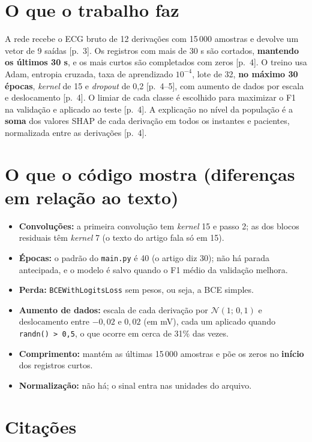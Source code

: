 \documentclass[11pt,a4paper]{article}
\begin{document}
\section{O que o trabalho faz}
A rede recebe o ECG bruto de 12 derivações com 15\,000 amostras e devolve um vetor de 9 saídas [p.~3]. Os registros com mais de 30 s são cortados, \textbf{mantendo os últimos 30 s}, e os mais curtos são completados com zeros [p.~4]. O treino usa Adam, entropia cruzada, taxa de aprendizado $10^{-4}$, lote de 32, \textbf{no máximo 30 épocas}, \textit{kernel} de 15 e \textit{dropout} de 0,2 [p.~4--5], com aumento de dados por escala e deslocamento [p.~4]. O limiar de cada classe é escolhido para maximizar o F1 na validação e aplicado ao teste [p.~4]. A explicação no nível da população é a \textbf{soma} dos valores SHAP de cada derivação em todos os instantes e pacientes, normalizada entre as derivações [p.~4].

\section{O que o código mostra (diferenças em relação ao texto)}
\begin{itemize}
\item \textbf{Convoluções:} a primeira convolução tem \textit{kernel} 15 e passo 2; as dos blocos residuais têm \textit{kernel} 7 (o texto do artigo fala só em 15).
\item \textbf{Épocas:} o padrão do \texttt{main.py} é 40 (o artigo diz 30); não há parada antecipada, e o modelo é salvo quando o F1 médio da validação melhora.
\item \textbf{Perda:} \texttt{BCEWithLogitsLoss} sem pesos, ou seja, a BCE simples.
\item \textbf{Aumento de dados:} escala de cada derivação por $\mathcal{N}(1;\,0{,}1)$ e deslocamento entre $-0{,}02$ e $0{,}02$ (em mV), cada um aplicado quando \texttt{randn() > 0,5}, o que ocorre em cerca de 31\% das vezes.
\item \textbf{Comprimento:} mantém as últimas 15\,000 amostras e põe os zeros no \textbf{início} dos registros curtos.
\item \textbf{Normalização:} não há; o sinal entra nas unidades do arquivo.
\end{itemize}

\section{Citações}
\end{document}

